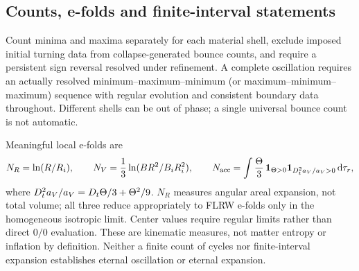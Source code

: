 \subsection{Counts, e-folds and finite-interval statements}
Count minima and maxima separately for each material shell, exclude imposed initial turning data from collapse-generated bounce counts, and require a persistent sign reversal resolved under refinement. A complete oscillation requires an actually resolved minimum--maximum--minimum (or maximum--minimum--maximum) sequence with regular evolution and consistent boundary data throughout. Different shells can be out of phase; a single universal bounce count is not automatic.

Meaningful local e-folds are
\begin{equation}
 N_R=\ln(R/R_i),\qquad N_V=\frac13\ln(BR^2/B_iR_i^2),\qquad
 N_{\rm acc}=\int \frac\Theta3\,\mathbf1_{\Theta>0}\mathbf1_{D_t^2a_V/a_V>0}\,\mathrm d\tau_r,
\end{equation}
where $D_t^2a_V/a_V=D_t\Theta/3+\Theta^2/9$. $N_R$ measures angular areal expansion, not total volume; all three reduce appropriately to FLRW e-folds only in the homogeneous isotropic limit. Center values require regular limits rather than direct $0/0$ evaluation. These are kinematic measures, not matter entropy or inflation by definition. Neither a finite count of cycles nor finite-interval expansion establishes eternal oscillation or eternal expansion.
